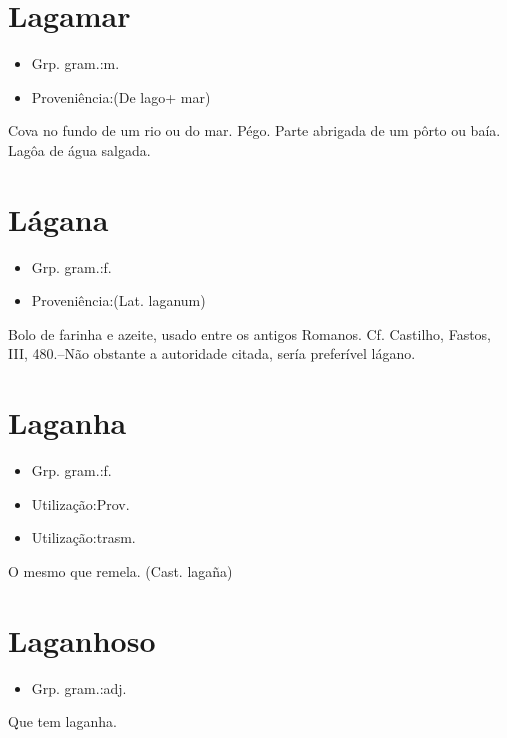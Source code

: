 \section{Lagamar}
\begin{itemize}
\item {Grp. gram.:m.}
\end{itemize}
\begin{itemize}
\item {Proveniência:(De \textunderscore lago\textunderscore  + \textunderscore mar\textunderscore )}
\end{itemize}
Cova no fundo de um rio ou do mar.
Pégo.
Parte abrigada de um pôrto ou baía.
Lagôa de água salgada.
\section{Lágana}
\begin{itemize}
\item {Grp. gram.:f.}
\end{itemize}
\begin{itemize}
\item {Proveniência:(Lat. \textunderscore laganum\textunderscore )}
\end{itemize}
Bolo de farinha e azeite, usado entre os antigos Romanos. Cf. Castilho, \textunderscore Fastos\textunderscore , III, 480.--Não obstante a autoridade citada, sería preferível \textunderscore lágano\textunderscore .
\section{Laganha}
\begin{itemize}
\item {Grp. gram.:f.}
\end{itemize}
\begin{itemize}
\item {Utilização:Prov.}
\end{itemize}
\begin{itemize}
\item {Utilização:trasm.}
\end{itemize}
O mesmo que \textunderscore remela\textunderscore .
(Cast. \textunderscore lagaña\textunderscore )
\section{Laganhoso}
\begin{itemize}
\item {Grp. gram.:adj.}
\end{itemize}
Que tem laganha.
